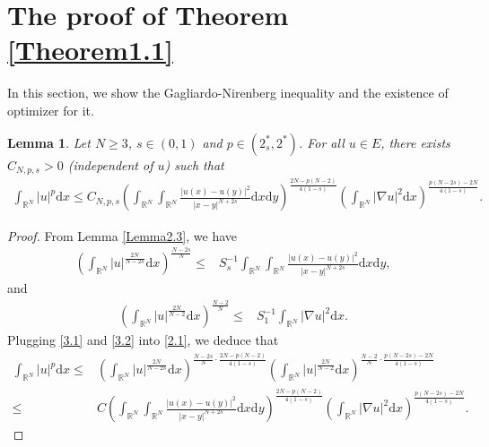 \documentclass[12pt,a4paper,reqno]{amsart}
\numberwithin{equation}{section}
\newtheorem{lemma}{Lemma}[section]
\begin{document}
\section{The proof of Theorem \ref{Theorem1.1}}
In this section, we show the Gagliardo-Nirenberg inequality
and the existence of optimizer for it.
\begin{lemma}\label{Lemma3.1}
Let $N\geqslant3$, $s\in(0,1)$ and $p\in (2^{*}_{s},2^{*})$.
For all $u\in E$, there exists $C_{N,p,s}>0$ (independent of $u$) such that
\begin{equation*}
\begin{aligned}
\int_{\mathbb{R}^{N}}
|u|^{p}
\mathrm{d}x
\leqslant
C_{N,p,s}
\left(
\int_{\mathbb{R}^{N}}
\int_{\mathbb{R}^{N}}
\frac{|u(x)-u(y)|^{2}}{|x-y|^{N+2s}}
\mathrm{d}x
\mathrm{d}y
\right)
^{\frac{2N-p(N-2)}{4(1-s)}}
\left(
\int_{\mathbb{R}^{N}}
|\nabla u|^{2}
\mathrm{d}x
\right)
^{\frac{p(N-2s)-2N}{4(1-s)}}.
\end{aligned}
\end{equation*}
\end{lemma}
\begin{proof}
From Lemma \ref{Lemma2.3}, we have
\begin{equation}\label{3.1}
\begin{aligned}
\left(
\int_{\mathbb{R}^{N}}
|u|^{\frac{2N}{N-2s}}
\mathrm{d}x
\right)
^{\frac{N-2s}{N}}
\leqslant&
S_{s}^{-1}
\int_{\mathbb{R}^{N}}
\int_{\mathbb{R}^{N}}
\frac{|u(x)-u(y)|^{2}}{|x-y|^{N+2s}}
\mathrm{d}x
\mathrm{d}y,
\end{aligned}
\end{equation}
and
\begin{equation}\label{3.2}
\begin{aligned}
\left(
\int_{\mathbb{R}^{N}}
|u|^{\frac{2N}{N-2}}
\mathrm{d}x
\right)
^{\frac{N-2}{N}}
\leqslant&
S_{1}^{-1}
\int_{\mathbb{R}^{N}}
|\nabla u|^{2}
\mathrm{d}x.
\end{aligned}
\end{equation}
Plugging \eqref{3.1} and \eqref{3.2} into \eqref{2.1}, we deduce that
\begin{equation*}
\begin{aligned}
\int_{\mathbb{R}^{N}}
|u|^{p}
\mathrm{d}x
\leqslant&
\left(
\int_{\mathbb{R}^{N}}
|u|^{\frac{2N}{N-2s}}
\mathrm{d}x
\right)
^{\frac{N-2s}{N}\cdot\frac{2N-p(N-2)}{4(1-s)}}
\left(
\int_{\mathbb{R}^{N}}
|u|^{\frac{2N}{N-2}}
\mathrm{d}x
\right)
^{\frac{N-2}{N}\cdot
\frac{p(N-2s)-2N}{4(1-s)}}\\
\leqslant&
C
\left(
\int_{\mathbb{R}^{N}}
\int_{\mathbb{R}^{N}}
\frac{|u(x)-u(y)|^{2}}{|x-y|^{N+2s}}
\mathrm{d}x
\mathrm{d}y
\right)
^{\frac{2N-p(N-2)}{4(1-s)}}
\left(
\int_{\mathbb{R}^{N}}
|\nabla u|^{2}
\mathrm{d}x
\right)
^{\frac{p(N-2s)-2N}{4(1-s)}}.
\end{aligned}
\end{equation*}
\end{proof}
\end{document}
